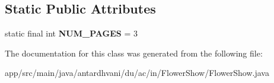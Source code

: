 \subsection*{Static Public Attributes}
\begin{DoxyCompactItemize}
\item 
\hypertarget{classantardhvani_1_1du_1_1ac_1_1in_1_1_flower_show_1_1_flower_show_a6ef15d7ad4b50ae63a5b54e71803fa55}{}static final int {\bfseries N\+U\+M\+\_\+\+P\+A\+G\+E\+S} = 3\label{classantardhvani_1_1du_1_1ac_1_1in_1_1_flower_show_1_1_flower_show_a6ef15d7ad4b50ae63a5b54e71803fa55}

\end{DoxyCompactItemize}


The documentation for this class was generated from the following file\+:\begin{DoxyCompactItemize}
\item 
app/src/main/java/antardhvani/du/ac/in/\+Flower\+Show/Flower\+Show.\+java\end{DoxyCompactItemize}

